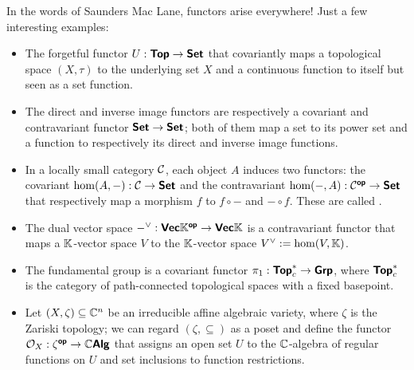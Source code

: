 \documentclass{article}
\begin{document}
In the words of Saunders Mac Lane, functors arise everywhere! Just a few interesting examples:\begin{itemize}
    \item The forgetful functor $U : \text{\sffamily\textbf{Top}} \to \text{\sffamily\textbf{Set}}$ that covariantly maps a topological space $(X,\tau)$ to the underlying set $X$ and a continuous function to itself but seen as a set function.
    \item The direct and inverse image functors are respectively a covariant and contravariant functor $\text{\sffamily\textbf{Set}}\to\text{\sffamily\textbf{Set}}$; both of them map a set to its power set and a function to respectively its direct and inverse image functions.
    \item In a locally small category $\mathcal{C}$, each object $A$ induces two functors: the covariant $\hom(A,-):\mathcal{C}\to\text{\sffamily\textbf{Set}}$ and the contravariant $\hom(-,A):\mathcal{C}^{\text{\sffamily\textbf{op}}}\to\text{\sffamily\textbf{Set}}$ that respectively map a morphism $f$ to $f\circ -$ and $-\circ f$. These are called .
    \item The dual vector space $-^\vee : \text{\sffamily\textbf{Vec}}\mathbb{K}^{\text{\sffamily\textbf{op}}} \to \text{\sffamily\textbf{Vec}}\mathbb{K}$ is a contravariant functor that maps a $\mathbb{K}$-vector space $V$ to the $\mathbb{K}$-vector space $V^\vee := \hom(V,\mathbb{K})$.
    \item The fundamental group is a covariant functor $\pi_1 : \text{\sffamily\textbf{Top}}_c^* \to \text{\sffamily\textbf{Grp}}$, where $\text{\sffamily\textbf{Top}}_c^*$ is the category of path-connected topological spaces with a fixed basepoint.
    \item Let $(X, \zeta) \subseteq \mathbb{C}^n$ be an irreducible affine algebraic variety, where $\zeta$ is the Zariski topology; we can regard $(\zeta,\subseteq)$ as a poset and define the functor $\mathcal{O}_X : \zeta^{\text{\sffamily\textbf{op}}} \to \mathbb{C}\text{\sffamily\textbf{Alg}}$ that assigns an open set $U$ to the $\mathbb{C}$-algebra of regular functions on $U$ and set inclusions to function restrictions.
\end{itemize}
\end{document}
